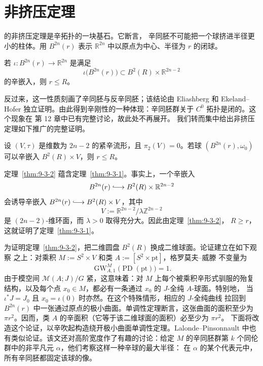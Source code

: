 
\section{非挤压定理}\label{sec:9-3}

的非挤压定理是辛拓扑的一块基石。它断言，
辛同胚不可能把一个球挤进半径更小的柱体。用 $B^{2n}(r)$ 表示
$\mathbb R^{2n}$ 中以原点为中心、半径为 $r$ 的闭球。

\begin{theorem}[格罗莫夫]\label{thm:9-3-1}
若 $\iota:B^{2n}(r)\to\mathbb R^{2n}$ 是满足
\[
  \iota\bigl(B^{2n}(r)\bigr)\subset B^2(R)\times\mathbb R^{2n-2}
\]
的辛嵌入，则 $r\le R$。
\end{theorem}

反过来，这一性质刻画了辛同胚与反辛同胚；该结论由 Eliashberg  和
Ekeland--Hofer  独立证明。由此得到辛刚性的一种体现：辛同胚群关于
$C^0$ 拓扑是闭的。这个现象在  第 12 章中已有完整讨论，故此处不再展开。
我们转而集中给出非挤压定理如下推广的完整证明。

\begin{theorem}\label{thm:9-3-2}
设 $(V,\tau)$ 是维数为 $2n-2$ 的紧辛流形，且 $\pi_2(V)=0$。若球
$(B^{2n}(r),\omega_0)$ 可以辛嵌入 $B^2(R)\times V$，则 $r\le R$。
\end{theorem}

定理~\ref{thm:9-3-2} 蕴含定理~\ref{thm:9-3-1}。事实上，一个辛嵌入
\[
  B^{2n}(r)\lhook\joinrel\longrightarrow B^2(R)\times\mathbb R^{2n-2}
\]
会诱导辛嵌入
$B^{2n}(r)\lhook\joinrel\longrightarrow B^2(R)\times V$，其中
\[
  V:=\mathbb R^{2n-2}/\lambda\mathbb Z^{2n-2}
\]
是 $(2n-2)$-维环面，而 $\lambda>0$ 取得充分大。因此由定理~\ref{thm:9-3-2}，
$R\ge r$，这就证明了定理~\ref{thm:9-3-1}。

为证明定理~\ref{thm:9-3-2}，把二维圆盘 $B^2(R)$ 换成二维球面。论证建立在如下观察
之上：对乘积 $M:=S^2\times V$ 和类 $A:=[S^2\times\mathrm{pt}]$，格罗莫夫--威滕
不变量为
\[
  \operatorname{GW}^{M}_{A,1}\bigl(\operatorname{PD}(\mathrm{pt})\bigr)=1.
\]
由于模空间 $\mathcal M(A;J)/G$ 紧，这意味着：对 $M$ 上每个被乘积辛形式驯服的殆复
结构，以及每个点 $x_0\in M$，都必有一条通过 $x_0$ 的 $J$-全纯 $A$-球面。特别地，
当 $\iota^*J=J_0$ 且 $x_0=\iota(0)$ 时亦然。在这个特殊情形，相应的 $J$-全纯曲线
拉回到 $B^{2n}(r)$ 中一张通过原点的极小曲面。单调性定理断言，这张曲面的面积至少为
$\pi r^2$。因而，类 $A$ 的辛面积（它等于该二维球面的面积）必至少为 $\pi r^2$。
下面将改造这个论证，以辛吹起构造绕开极小曲面单调性定理。Lalonde--Pinsonnault
 中也有类似论证。该文还对高阶宽度作了有趣的讨论：给定
$M$ 的辛同胚群第 $k$ 个同伦群中的非平凡元 $\alpha$，他们考察这样一种辛球的最大半径：
在 $\alpha$ 的某个代表元中，所有辛同胚都固定该球的像。

